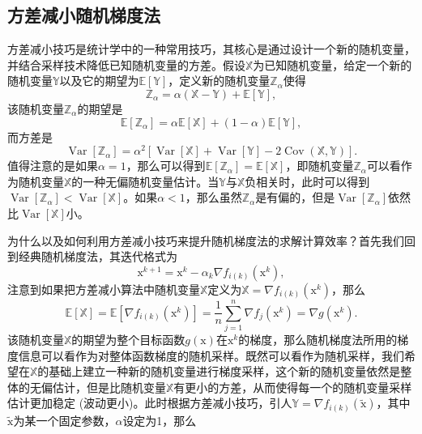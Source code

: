 \subsection{方差减小随机梯度法}
方差减小技巧是统计学中的一种常用技巧，其核心是通过设计一个新的随机变量，并结合采样技术降低已知随机变量的方差\cite{SVRG}。假设$\mathbb{X}$为已知随机变量，给定一个新的随机变量$\mathbb{Y}$以及它的期望为$\mathbb{E}[\mathbb{Y}]$，定义新的随机变量$\mathbb{Z}_{\alpha}$使得
\begin{equation}
    \mathbb{Z}_{\alpha}=\alpha(\mathbb{X}-\mathbb{Y})+\mathbb{E}[\mathbb{Y}],
    \nonumber
\end{equation}
该随机变量$\mathbb{Z}_{\alpha}$的期望是
\begin{equation}
    \mathbb{E}\left[\mathbb{Z}_{\alpha}\right]=\alpha \mathbb{E}[\mathbb{X}]+(1-\alpha) \mathbb{E}[\mathbb{Y}] ,
    \nonumber
\end{equation}
而方差是
\begin{equation}
    \operatorname{Var}\left[\mathbb{Z}_{\alpha}\right]=\alpha^{2}[\operatorname{Var}[\mathbb{X}]+\operatorname{Var}[\mathbb{Y}]-2 \operatorname{Cov}(\mathbb{X}, \mathbb{Y})]
    \text {.}
    \nonumber
\end{equation}
值得注意的是如果$\alpha=1$，那么可以得到$\mathbb{E}\left[\mathbb{Z}_{\alpha}\right]=\mathbb{E}[\mathbb{X}]$，即随机变量$\mathbb{Z}_{\alpha}$可以看作为随机变量$\mathbb{X}$的一种无偏随机变量估计。当$\mathbb{Y}$与$\mathbb{X}$负相关时，此时可以得到$\operatorname{Var}\left[\mathbb{Z}_{\alpha}\right]<\operatorname{Var}[\mathbb{X}]$。如果$\alpha<1$，那么虽然$\mathbb{Z}_{\alpha}$是有偏的，但是$\operatorname{Var}\left[\mathbb{Z}_{\alpha}\right]$依然比$\operatorname{Var}[\mathbb{X}]$小。
\par 为什么以及如何利用方差减小技巧来提升随机梯度法的求解计算效率？首先我们回到经典随机梯度法，其迭代格式为
\begin{equation}
    \mathrm{x}^{k+1}=\mathrm{x}^{k}-\alpha_{k} \nabla f_{i(k)}\left(\mathrm{x}^{k}\right) ,
    \nonumber
\end{equation}
注意到如果把方差减小算法中随机变量$\mathbb{X}$定义为$\mathbb{X}=\nabla f_{i(k)}\left(\mathrm{x}^{k}\right)$，那么
\begin{equation}
    \mathbb{E}[\mathbb{X}]=\mathbb{E}\left[\nabla f_{i(k)}\left(\mathrm{x}^{k}\right)\right]=\frac{1}{n} \sum_{j=1}^{n} \nabla f_{j}\left(\mathrm{x}^{k}\right)=\nabla g\left(\mathrm{x}^{k}\right) .
    \nonumber
\end{equation}
该随机变量$\mathbb{X}$的期望为整个目标函数$g(\mathrm{x})$在$\mathrm{x}^{k}$的梯度，那么随机梯度法所用的梯度信息可以看作为对整体函数梯度的随机采样。既然可以看作为随机采样，我们希望在$\mathbb{X}$的基础上建立一种新的随机变量进行梯度采样，这个新的随机变量依然是整体的无偏估计，但是比随机变量$\mathbb{X}$有更小的方差，从而使得每一个的随机变量采样估计更加稳定 (波动更小)。此时根据方差减小技巧，引人$\mathbb{Y}=\nabla f_{i(k)}(\tilde{\mathrm{x}})$，其中$\tilde{\mathrm{x}} $为某一个固定参数，$\alpha$设定为1，那么
